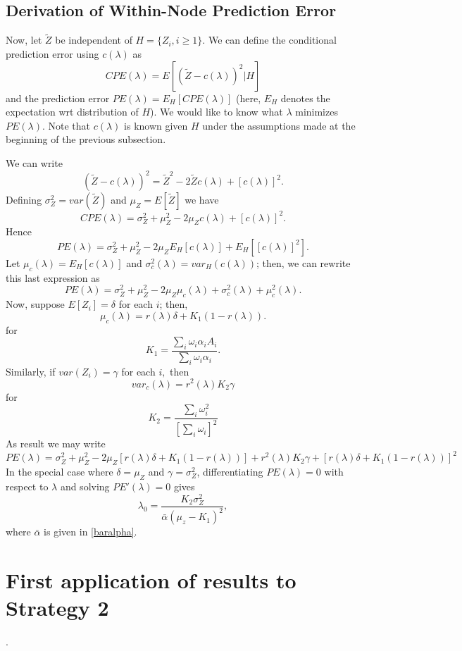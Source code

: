 \documentclass[12pt]{article}
\begin{document}
\subsection{Derivation of Within-Node Prediction Error}
\label{PE}
Now, let $\tilde{Z}$ be independent of $H = \{Z_i, i \geq 1\}.$ We can
define the conditional prediction error using $c(\lambda)$ as
\[
CPE(\lambda) = E\left[ (\tilde Z - c(\lambda))^2 | H \right]
\] 
and the prediction error $PE(\lambda) = E_H\left[ CPE(\lambda)
  \right]$ (here, $E_H$ denotes the expectation wrt distribution of
$H$).  We would like to know what $\lambda$ minimizes
$PE(\lambda)$. Note that $c(\lambda)$ is known given $H$ under the
assumptions made at the beginning of the previous subsection.

We can write
\[
(\tilde Z - c(\lambda))^2 = \tilde Z^2 - 2 \tilde Z c(\lambda) + [c(\lambda)]^2.
\]
Defining $\sigma^2_Z = var(\tilde Z)$ and $\mu_Z = E[\tilde Z]$ we have
\[
CPE(\lambda) = \sigma^2_Z + \mu^2_Z - 2 \mu_Z c(\lambda) + [c(\lambda)]^2.
\]
Hence
\[
PE(\lambda) = \sigma^2_Z + \mu^2_Z - 2 \mu_Z E_H[c(\lambda)] + E_H[[c(\lambda)]^2].
\]
Let $\mu_c(\lambda) = E_H[c(\lambda)] $ and $\sigma^2_c(\lambda) =
var_H(c(\lambda))$; then, we can rewrite this last expression as
\[
PE(\lambda) = \sigma^2_Z + \mu^2_Z - 2 \mu_Z \mu_c(\lambda) + \sigma^2_c(\lambda) + \mu^2_c(\lambda).
\]
Now, suppose $E[Z_i] = \delta$ for each $i$; then,
\[
\mu_c(\lambda) = r(\lambda) \delta+ K_1 (1-r(\lambda)).
\]
for
\[
K_1 =  \frac{ \sum_i \omega_i \alpha_i A_i}{ \sum_i \omega_i \alpha_i }.
\]
Similarly, if $var(Z_i) = \gamma$ for each $i,$ then
\[
var_c(\lambda) = r^2(\lambda) K_2 \gamma
\]
for 
\[
K_2 = \frac{ \sum_i \omega_i^2 }{[ \sum_i \omega_i]^2}
\]
As result we may write
\[
PE(\lambda) = \sigma^2_Z + \mu^2_Z - 2 \mu_Z [r(\lambda) \delta + K_1 (1-r(\lambda)) ] + 
r^2(\lambda) K_2 \gamma + 
[r(\lambda) \delta + K_1 (1-r(\lambda))]^2
\]
In the special case where $\delta = \mu_Z$ and $\gamma = \sigma^2_Z$,
differentiating $PE(\lambda) = 0$ with respect to $\lambda$ and
solving $PE'(\lambda) = 0$ gives
\begin{equation}
\label{lam-opt}
\lambda_0 = \frac{K_2 \sigma^2_Z}{ \bar{\alpha} (\mu_z - K_1)^2},
\end{equation}
where $\bar \alpha$ is given in \eqref{baralpha}.



\section{First application of results to Strategy 2}.
\end{document}
